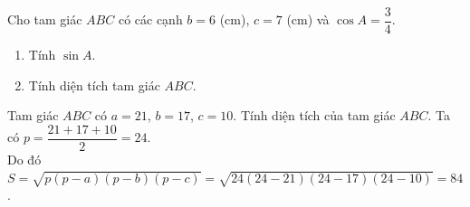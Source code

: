 \begin{bt}%
	Cho tam giác $ABC$ có các cạnh $b=6$ (cm), $c=7$ (cm) và $\cos A=\dfrac{3}{4}$.
	\begin{enumerate}
		\item Tính $\sin A$.
		\item Tính diện tích tam giác $ABC$.
	\end{enumerate}
\end{bt}

\begin{bt}%
	Tam giác $ ABC$ có $ a=21$, $b=17$, $c=10$. Tính diện tích của tam giác $ ABC$.
	\loigiai
	{Ta có $ p=\dfrac{21+17+10}{2}=24$.\\
		Do đó $ S=\sqrt{p(p-a )(p-b )(p-c )}=\sqrt{24(24-21 )(24-17 )(24-10 )}=84$.}
\end{bt}

